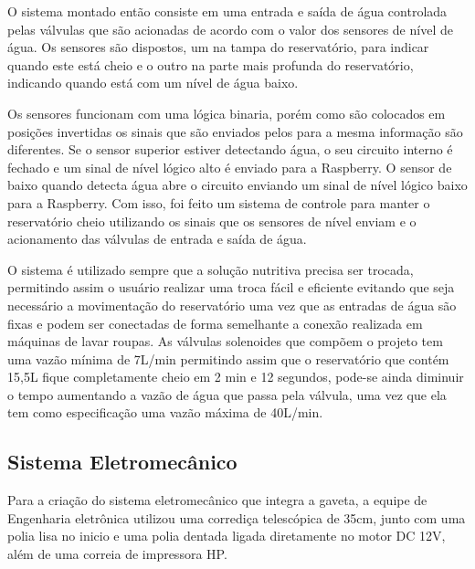 O sistema montado então consiste em uma entrada e saída de água controlada pelas válvulas que são acionadas de acordo com o valor dos sensores de nível de água. Os sensores são dispostos, um na tampa do reservatório, para indicar quando este está cheio e o outro na parte mais profunda do reservatório, indicando quando está com um nível de água baixo.

Os sensores funcionam com uma lógica binaria, porém como são colocados em posições invertidas os sinais que são enviados pelos para a mesma informação são diferentes. Se  o sensor superior estiver detectando água, o seu circuito interno é fechado e um sinal de nível lógico alto é enviado para a Raspberry. O sensor de baixo quando detecta água abre o circuito enviando um sinal de nível lógico baixo para a Raspberry. Com isso, foi feito um sistema de controle para manter o reservatório cheio utilizando os sinais que os sensores de nível enviam e o acionamento das válvulas de entrada e saída de água. 

O sistema é utilizado sempre que a solução nutritiva precisa ser trocada, permitindo assim o usuário realizar uma troca fácil e eficiente evitando que seja necessário a movimentação do reservatório uma vez que as entradas de água são fixas e podem ser conectadas de forma semelhante a conexão realizada em máquinas de lavar roupas.
As válvulas solenoides que compõem o projeto tem uma vazão mínima de 7L/min permitindo assim que o reservatório que contém 15,5L fique completamente cheio em 2 min e 12 segundos, pode-se ainda diminuir o tempo aumentando a vazão de água que passa pela válvula, uma vez que ela tem como especificação uma vazão máxima de 40L/min.

\subsection{Sistema Eletromecânico}

Para a criação do sistema eletromecânico que integra a gaveta, a equipe de Engenharia eletrônica utilizou uma corrediça telescópica de 35cm, junto com uma polia lisa no inicio e uma polia dentada ligada diretamente no motor DC 12V, além de uma correia de impressora HP. \cite{MotorCC}

